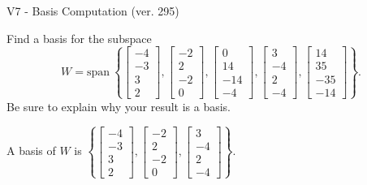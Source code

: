 \begin{exercise}
  \begin{exerciseTitle}V7 - Basis Computation (ver. 295)\end{exerciseTitle}
  \begin{exerciseStatement}
    Find a basis for the subspace 
\[W=\mathrm{span}\ \left\{\left[\begin{array}{r}
-4 \\
-3 \\
3 \\
2
\end{array}\right] , \left[\begin{array}{r}
-2 \\
2 \\
-2 \\
0
\end{array}\right] , \left[\begin{array}{r}
0 \\
14 \\
-14 \\
-4
\end{array}\right] , \left[\begin{array}{r}
3 \\
-4 \\
2 \\
-4
\end{array}\right] , \left[\begin{array}{r}
14 \\
35 \\
-35 \\
-14
\end{array}\right]\right\}.\]
 Be sure to explain why your result is a basis.


  \end{exerciseStatement}
  \begin{exerciseAnswer}
   A basis of \(W\) is  \(\left\{\left[\begin{array}{r}
-4 \\
-3 \\
3 \\
2
\end{array}\right] , \left[\begin{array}{r}
-2 \\
2 \\
-2 \\
0
\end{array}\right] , \left[\begin{array}{r}
3 \\
-4 \\
2 \\
-4
\end{array}\right]\right\}\).
  


  \end{exerciseAnswer}
\end{exercise}